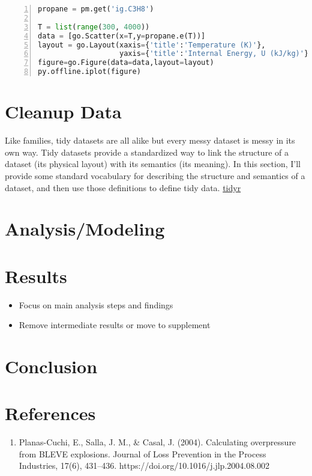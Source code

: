 \documentclass[10pt,parskip=half,
toc=sectionentrywithdots,
bibliography=totocnumbered,
captions=tableheading,numbers=noendperiod]{scrartcl}
\providecommand{\tightlist}{%
  \setlength{\itemsep}{0pt}\setlength{\parskip}{0pt}}
\begin{document}
\begin{lstlisting}[language=Python,numbers=left,xleftmargin=20pt,xrightmargin=5pt,belowskip=5pt,aboveskip=5pt]
propane = pm.get('ig.C3H8')

T = list(range(300, 4000))
data = [go.Scatter(x=T,y=propane.e(T))]
layout = go.Layout(xaxis={'title':'Temperature (K)'},
                   yaxis={'title':'Internal Energy, U (kJ/kg)'})
figure=go.Figure(data=data,layout=layout)
py.offline.iplot(figure)
\end{lstlisting}

\hypertarget{cleanup-data}{%
\section{Cleanup Data}\label{cleanup-data}}

Like families, tidy datasets are all alike but every messy dataset is
messy in its own way. Tidy datasets provide a standardized way to link
the structure of a dataset (its physical layout) with its semantics (its
meaning). In this section, I'll provide some standard vocabulary for
describing the structure and semantics of a dataset, and then use those
definitions to define tidy data.
\href{https://tidyr.tidyverse.org/articles/tidy-data.html}{tidyr}

\hypertarget{analysismodeling}{%
\section{Analysis/Modeling}\label{analysismodeling}}

\hypertarget{results}{%
\section{Results}\label{results}}

\begin{itemize}
\tightlist
\item
  Focus on main analysis steps and findings
\item
  Remove intermediate results or move to supplement
\end{itemize}

\hypertarget{conclusion}{%
\section{Conclusion}\label{conclusion}}

\hypertarget{references}{%
\section{References}\label{references}}

\begin{enumerate}
\def\labelenumi{\arabic{enumi}.}
\tightlist
\item
  Planas-Cuchi, E., Salla, J. M., \& Casal, J. (2004). Calculating
  overpressure from BLEVE explosions. Journal of Loss Prevention in the
  Process Industries, 17(6), 431--436.
  https://doi.org/10.1016/j.jlp.2004.08.002
\end{enumerate}
\end{document}
